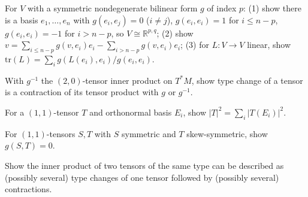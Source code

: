 \begin{remark}
  \label{rem:pet-ch1-ex-10}
  \leanok
  For $V$ with a symmetric nondegenerate bilinear form $g$ of index $p$: (1) show
  there is a basis $e_1,\dots,e_n$ with $g(e_i,e_j)=0$ ($i\ne j$),
  $g(e_i,e_i)=1$ for $i\le n-p$, $g(e_i,e_i)=-1$ for $i>n-p$, so $V\cong\mathbb{R}^{p,q}$;
  (2) show $v=\sum_{i\le n-p}g(v,e_i)e_i-\sum_{i>n-p}g(v,e_i)e_i$; (3) for
  $L:V\to V$ linear, show
  $\mathrm{tr}(L)=\sum_ig(L(e_i),e_i)/g(e_i,e_i)$.
\end{remark}

\begin{remark}
  \label{rem:pet-ch1-ex-11}
  \leanok
  With $g^{-1}$ the $(2,0)$-tensor inner product on $T^*M$, show type change of a
  tensor is a contraction of its tensor product with $g$ or $g^{-1}$.
\end{remark}

\begin{remark}
  \label{rem:pet-ch1-ex-12}
  \leanok
  For a $(1,1)$-tensor $T$ and orthonormal basis $E_i$, show
  $|T|^2=\sum_i|T(E_i)|^2$.
\end{remark}

\begin{remark}
  \label{rem:pet-ch1-ex-13}
  \leanok
  For $(1,1)$-tensors $S,T$ with $S$ symmetric and $T$ skew-symmetric, show
  $g(S,T)=0$.
\end{remark}

\begin{remark}
  \label{rem:pet-ch1-ex-14}
  \leanok
  Show the inner product of two tensors of the same type can be described as
  (possibly several) type changes of one tensor followed by (possibly several)
  contractions.
\end{remark}


